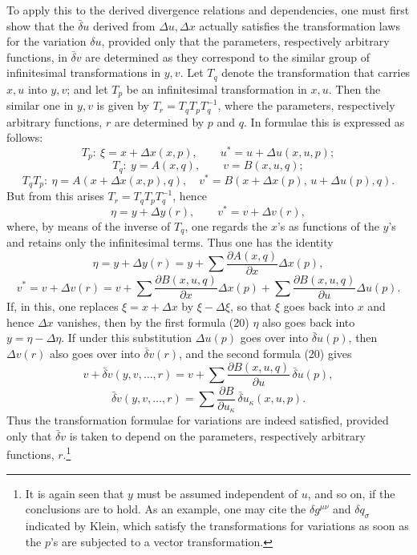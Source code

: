 \documentclass[11pt]{article}
\newcommand{\D}{\Delta}
\providecommand{\bd}{\bar{\delta}}
\providecommand{\p}{\partial}
\providecommand{\p}{\partial}
\begin{document}
To apply this to the derived divergence relations and dependencies, one must first show that the \(\bd u\) derived from \(\D u,\D x\) actually satisfies the transformation laws for the variation \(\delta u\), provided only that the parameters, respectively arbitrary functions, in \(\bd v\) are determined as they correspond to the similar group of infinitesimal transformations in \(y,v\). Let \(T_q\) denote the transformation that carries \(x,u\) into \(y,v\); and let \(T_p\) be an infinitesimal transformation in \(x,u\). Then the similar one in \(y,v\) is given by \(T_r=T_qT_pT_q^{-1}\), where the parameters, respectively arbitrary functions, \(r\) are determined by \(p\) and \(q\). In formulae this is expressed as follows:
\[
T_p:\ \xi=x+\D x(x,p),\qquad u^*=u+\D u(x,u,p);
\]
\[
T_q:\ y=A(x,q),\qquad v=B(x,u,q);
\]
\[
T_qT_p:\ \eta=A(x+\D x(x,p),q),\quad
v^*=B(x+\D x(p),\,u+\D u(p),q).
\]
But from this arises \(T_r=T_qT_pT_q^{-1}\), hence
\[
\eta=y+\D y(r),\qquad v^*=v+\D v(r),
\]
where, by means of the inverse of \(T_q\), one regards the \(x\)'s as functions of the \(y\)'s and retains only the infinitesimal terms. Thus one has the identity
\begin{equation}
\eta=y+\D y(r)=y+\sum\frac{\p A(x,q)}{\p x}\D x(p),
\tag{20a}
\end{equation}
\begin{equation}
v^*=v+\D v(r)=v+\sum\frac{\p B(x,u,q)}{\p x}\D x(p)
+\sum\frac{\p B(x,u,q)}{\p u}\D u(p).
\tag{20b}
\end{equation}
If, in this, one replaces \(\xi=x+\D x\) by \(\xi-\D \xi\), so that \(\xi\) goes back into \(x\) and hence \(\D x\) vanishes, then by the first formula (20) \(\eta\) also goes back into \(y=\eta-\D\eta\). If under this substitution \(\D u(p)\) goes over into \(\bd u(p)\), then \(\D v(r)\) also goes over into \(\bd v(r)\), and the second formula (20) gives
\[
v+\bd v(y,v,\ldots,r)=v+\sum\frac{\p B(x,u,q)}{\p u}\,\bd u(p),
\]
\[
\bd v(y,v,\ldots,r)=\sum\frac{\p B}{\p u_\kappa}\,\bd u_\kappa(x,u,p).
\]
Thus the transformation formulae for variations are indeed satisfied, provided only that \(\bd v\) is taken to depend on the parameters, respectively arbitrary functions, \(r\).\footnote{It is again seen that \(y\) must be assumed independent of \(u\), and so on, if the conclusions are to hold. As an example, one may cite the \(\delta g^{\mu\nu}\) and \(\delta q_\sigma\) indicated by Klein, which satisfy the transformations for variations as soon as the \(p\)'s are subjected to a vector transformation.}
\end{document}
